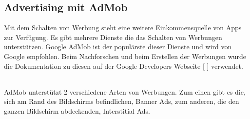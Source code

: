 \documentclass[FIPLY_base.tex]{subfiles}
\author{Andreas Denkmayr}
\date{25. Februar 2016}
\begin{document}
\subsection{Advertising mit AdMob}
Mit dem Schalten von Werbung steht eine weitere Einkommensquelle von Apps zur Verfügung.\newline
Es gibt mehrere Dienste die das Schalten von Werbungen unterstützen. \newline
Google AdMob ist der populärste dieser Dienste und wird von Google empfohlen. \newline
Beim Nachforschen und beim Erstellen der Werbungen wurde die Dokumentation zu diesen auf der Google Developers Webseite [ \cite{gdAdMob}] verwendet. 

\ \\
AdMob unterstützt 2 verschiedene Arten von Werbungen. 
Zum einen gibt es die, sich am Rand des Bildschirms befindlichen, Banner Ads, zum anderen, die den ganzen Bildschirm abdeckenden, Interstitial Ads.
\ \\
\end{document}
